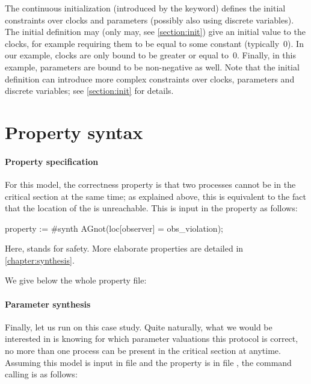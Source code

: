 The continuous initialization (introduced by the  keyword) defines the initial constraints over clocks and parameters (possibly also using discrete variables).
%
The initial definition may (only may, see \cref{section:init}) give an initial value to the clocks, for example requiring them to be equal to some constant (typically~0).
In our example, clocks are only bound to be greater or equal to~0.
%
Finally, in this example, parameters are bound to be non-negative as well.
%
Note that the initial definition can introduce more complex constraints over clocks, parameters and discrete variables; see \cref{section:init} for details.




\section{Property syntax}

\paragraph{Property specification}
For this model, the correctness property is that two processes cannot be in the critical section at the same time; as explained above, this is equivalent to the fact that the  location of the  \IPTA{} is unreachable.
This is input in the property as follows:

\begin{IMITATORproperty}
	property := #synth AGnot(loc[observer] = obs_violation);
\end{IMITATORproperty}

Here,  stands for safety.
More elaborate properties are detailed in \cref{chapter:synthesis}.

We give below the whole property file:




\paragraph{Parameter synthesis}
Finally, let us run \imitator{} on this case study.
Quite naturally, what we would be interested in is knowing for which parameter valuations this protocol is correct, \ie{} no more than one process can be present in the critical section at anytime.
Assuming this model is input in file  and the property is in file , the command calling \imitator{} is as follows:



